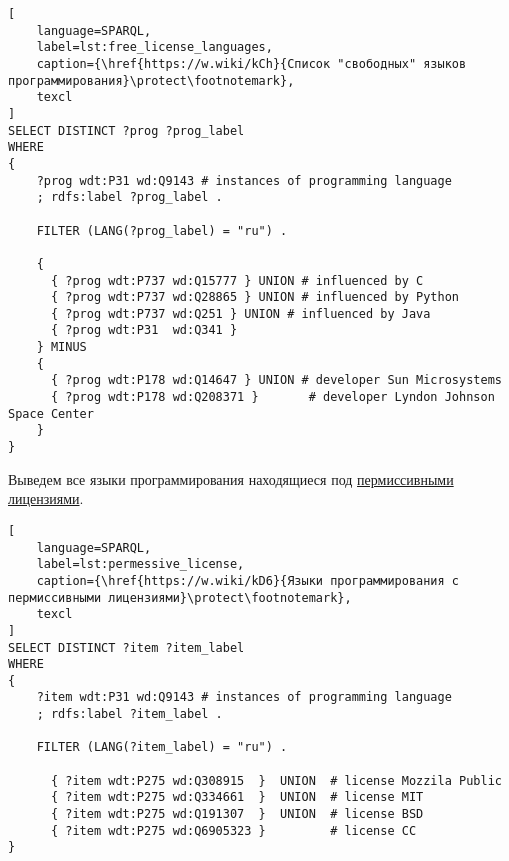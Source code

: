 \pagebreak
{}
\begin{lstlisting}[
	language=SPARQL,
	label=lst:free_license_languages,
	caption={\href{https://w.wiki/kCh}{Список "свободных" языков программирования}\protect\footnotemark},
	texcl
]
SELECT DISTINCT ?prog ?prog_label
WHERE
{
    ?prog wdt:P31 wd:Q9143 # instances of programming language
    ; rdfs:label ?prog_label . 

    FILTER (LANG(?prog_label) = "ru") . 

    {
      { ?prog wdt:P737 wd:Q15777 } UNION # influenced by C
      { ?prog wdt:P737 wd:Q28865 } UNION # influenced by Python
      { ?prog wdt:P737 wd:Q251 } UNION # influenced by Java
      { ?prog wdt:P31  wd:Q341 }
    } MINUS 
  	{ 
      { ?prog wdt:P178 wd:Q14647 } UNION # developer Sun Microsystems
      { ?prog wdt:P178 wd:Q208371 }       # developer Lyndon Johnson Space Center
    }
}
\end{lstlisting}


Выведем все языки программирования находящиеся под \href{https://en.wikipedia.org/wiki/Permissive_software_license}{пермиссивными лицензиями}.
\begin{lstlisting}[
	language=SPARQL,
	label=lst:permessive_license,
	caption={\href{https://w.wiki/kD6}{Языки программирования с пермиссивными лицензиями}\protect\footnotemark},
	texcl
]
SELECT DISTINCT ?item ?item_label
WHERE
{
    ?item wdt:P31 wd:Q9143 # instances of programming language
    ; rdfs:label ?item_label . 

    FILTER (LANG(?item_label) = "ru") . 
  
      { ?item wdt:P275 wd:Q308915  }  UNION  # license Mozzila Public
      { ?item wdt:P275 wd:Q334661  }  UNION  # license MIT
      { ?item wdt:P275 wd:Q191307  }  UNION  # license BSD
      { ?item wdt:P275 wd:Q6905323 }         # license CC
}
\end{lstlisting}


